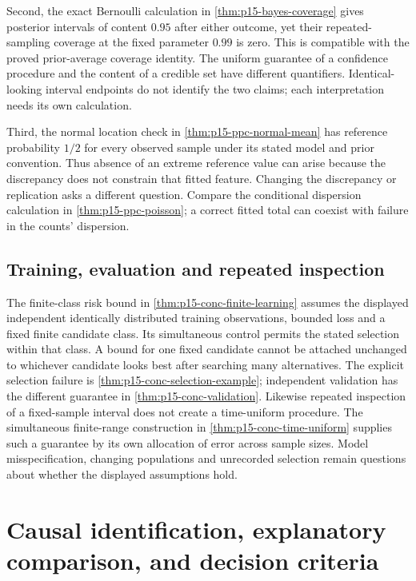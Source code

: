 Second, the exact Bernoulli calculation in \cref{thm:p15-bayes-coverage}
gives posterior intervals of content \(0.95\) after either outcome, yet
their repeated-sampling coverage at the fixed parameter \(0.99\) is zero.
This is compatible with the proved prior-average coverage identity. The
uniform guarantee of a confidence procedure and the content of a credible
set have different quantifiers. Identical-looking interval endpoints do
not identify the two claims; each interpretation needs its own calculation.

Third, the normal location check in \cref{thm:p15-ppc-normal-mean} has
reference probability \(1/2\) for every observed sample under its stated
model and prior convention. Thus absence of an extreme reference value
can arise because the discrepancy does not constrain that fitted feature.
Changing the discrepancy or replication asks a different question. Compare
the conditional dispersion calculation in \cref{thm:p15-ppc-poisson}; a
correct fitted total can coexist with failure in the counts' dispersion.

\subsection{Training, evaluation and repeated inspection}

The finite-class risk bound in \cref{thm:p15-conc-finite-learning} assumes
the displayed independent identically distributed training observations,
bounded loss and a fixed finite candidate class. Its simultaneous control
permits the stated selection within that class. A bound for one fixed
candidate cannot be attached unchanged to whichever candidate looks best
after searching many alternatives. The explicit selection failure is
\cref{thm:p15-conc-selection-example}; independent validation has the
different guarantee in \cref{thm:p15-conc-validation}.
Likewise repeated inspection of a fixed-sample interval does not create a
time-uniform procedure. The simultaneous finite-range construction in
\cref{thm:p15-conc-time-uniform} supplies such a guarantee by its own
allocation of error across sample sizes. Model misspecification, changing
populations and unrecorded selection remain questions about whether the
displayed assumptions hold.

\section{Causal identification, explanatory comparison, and decision criteria}
\label{sec:p14-evidence-causal-explanatory-decision}

